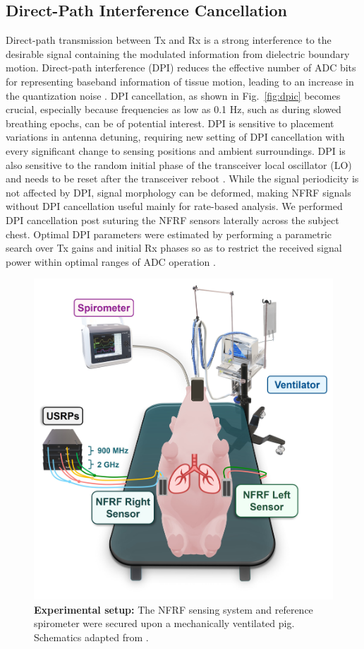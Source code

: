 \documentclass[journal,twoside,web]{ieeecolor}
\begin{document}
\subsection{Direct-Path Interference Cancellation}
Direct-path transmission between Tx and Rx is a strong interference to the desirable signal containing the modulated information from dielectric boundary motion. Direct-path interference (DPI) reduces the effective number of ADC bits for representing baseband information of tissue motion, leading to an increase in the quantization noise \cite{zhouMorphologyTransformationContent2022}\cite{kuoFullyIntegrated60GHz2016}. DPI cancellation, as shown in Fig.~\ref{fig:dpic} becomes crucial, especially because frequencies as low as 0.1 Hz, such as during slowed breathing epochs, can be of potential interest. DPI is sensitive to placement variations in antenna detuning, requiring new setting of DPI cancellation with every significant change to sensing positions and ambient surroundings. DPI is also sensitive to the random initial phase of the transceiver local oscillator (LO) and needs to be reset after the transceiver reboot \cite{xuPhaseOffsetCalibration2024}. While the signal periodicity is not affected by DPI, signal morphology can be deformed, making NFRF signals without DPI cancellation useful mainly for rate-based analysis.
We performed DPI cancellation post suturing the NFRF sensors laterally across the subject chest. Optimal DPI parameters were estimated by performing a parametric search over Tx gains and initial Rx phases so as to restrict the received signal power within optimal ranges of ADC operation \cite{huiNearFieldCoherentSensing2021}.
\begin{figure}[htbp]
\centering
\includegraphics[width=.45\textwidth]{setup_v6.jpg}
\caption{\textbf{Experimental setup:} The NFRF sensing system and reference spirometer were secured upon a mechanically ventilated pig. Schematics adapted from \cite{pig} \cite{ventilator} \cite{spirometer}.}
\label{fig:setup}
\end{figure}
\end{document}

